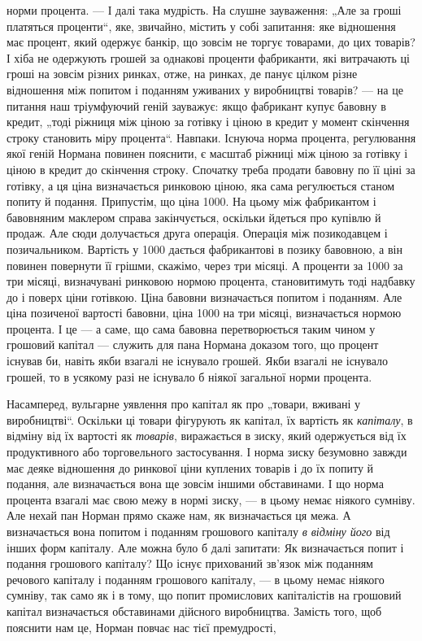 \parcont{}  %
норми процента. — І далі така мудрість. На слушне зауваження:
„Але за гроші платяться проценти“, яке, звичайно, містить у собі
запитання: яке відношення має процент, який одержує банкір,
що зовсім не торгує товарами, до цих товарів? І хіба не одержують грошей за однакові проценти
фабриканти, які витрачають
ці гроші на зовсім різних ринках, отже, на ринках, де панує
цілком різне відношення між попитом і поданням уживаних у виробництві товарів? — на це питання наш
тріумфуючий геній зауважує: якщо фабрикант купує бавовну в кредит, „тоді ріжниця між ціною за
готівку і ціною в кредит у момент скінчення строку становить міру процента“. Навпаки. Існуюча норма
процента, регулювання якої геній Нормана повинен пояснити, є масштаб ріжниці
між ціною за готівку і ціною в кредит до скінчення строку. Спочатку треба продати бавовну по її ціні
за готівку, а ця ціна визначається ринковою ціною, яка сама регулюється станом попиту
й подання. Припустім, що ціна \deq{} 1000. На цьому
між фабрикантом і бавовняним маклером справа закінчується,
оскільки йдеться про купівлю й продаж. Але сюди долучається
друга операція. Операція між позикодавцем і позичальником. Вартість у 1000 дається
фабрикантові в позику бавовною, а він повинен повернути її грішми, скажімо, через три місяці. А
проценти за 1000 за три місяці, визначувані
ринковою нормою процента, становитимуть тоді надбавку до і поверх ціни готівкою. Ціна бавовни
визначається попитом і поданням.
Але ціна позиченої вартості бавовни, ціна 1000 на
три місяці, визначається нормою процента. І це — а саме, що сама
бавовна перетворюється таким чином у грошовий капітал — служить для пана Нормана доказом того, що
процент існував би, навіть
якби взагалі не існувало грошей. Якби взагалі не існувало грошей,
то в усякому разі не існувало б ніякої загальної норми процента.

Насамперед, вульгарне уявлення про капітал як про „товари,
вживані у виробництві“. Оскільки ці товари фігурують як капітал, їх вартість як \emph{капіталу}, в відміну
від їх вартості як \emph{товарів}, виражається в зиску, який одержується від їх продуктивного або
торговельного застосування. І норма зиску безумовно
завжди має деяке відношення до ринкової ціни куплених товарів
і до їх попиту й подання, але визначається вона ще зовсім іншими
обставинами. І що норма процента взагалі має свою межу в нормі
зиску, — в цьому немає ніякого сумніву. Але нехай пан Норман
прямо скаже нам, як визначається ця межа. А визначається
вона попитом і поданням грошового капіталу \emph{в відміну його} від
інших форм капіталу. Але можна було б далі запитати: Як визначається попит і подання грошового
капіталу? Що існує прихований зв’язок між поданням речового капіталу і поданням грошового капіталу,
— в цьому немає ніякого сумніву, так само як
і в тому, що попит промислових капіталістів на грошовий капітал визначається обставинами дійсного
виробництва. Замість
того, щоб пояснити нам це, Норман повчає нас тієї премудрості,
\parbreak{}  %

